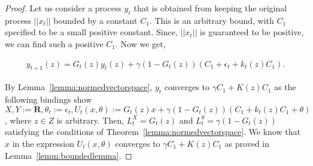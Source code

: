 \documentclass[jair, twoside,11pt,theapa]{article}
\begin{document}
\begin{proof}










Let us consider a process $y_t$ that is obtained from keeping the original process $||x_t||$ bounded by a constant $C_1$. This is an arbitrary bound, with $C_1$ specified to be a small positive constant. Since, $||x_t||$ is guaranteed to be positive, we can find such a positive $C_1$. Now we get,

\begin{equation}\label{eq:originalprocess}
    \begin{array}{l}
      y_{t+1}(z) = G_t(z) y_t(z)  + \gamma (1 - G_t(z)) (C_1 + \epsilon_t + k_t(z) C_1 ).
    \end{array}
\end{equation}

By Lemma~\ref{lemma:normedvectorspace}, $y_t$ converges to $\gamma C_1 + K(z) C_1 $ as the following bindings show $X, Y := \textbf{R}, \theta_t := \epsilon_t, U_t(x,\theta) := G_t(z)x + \gamma (1 - G_t(z)) (C_1 + k_t(z) C_1 + \theta)$, where $z \in Z$ is arbitrary. Then, $L^X_t = G_t(z)$ and $L^\theta_t = \gamma(1 - G_t(z))$ satisfying the conditions of Theorem~\ref{lemma:normedvectorspace}. We know that $x$ in the expression $U_t(x,\theta)$ converges to $\gamma C_1 + K(z) C_1 $ as proved in Lemma~\ref{lemm:boundedlemma}. 


\end{proof}
\end{document}
